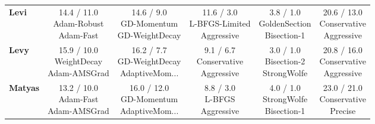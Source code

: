 \documentclass[10pt]{article}
\begin{document}
\begin{longtable}{lccccc}
\textbf{Levi} &  \makecell{14.4 / 11.0 \\ \scriptsize{Adam-Robust} \\ \scriptsize{Adam-Fast}}&  \makecell{14.6 / 9.0 \\ \scriptsize{GD-Momentum} \\ \scriptsize{GD-WeightDecay}}&  \makecell{11.6 / 3.0 \\ \scriptsize{L-BFGS-Limited} \\ \scriptsize{Aggressive}}& \cellcolor{green!20} \makecell{3.8 / 1.0 \\ \scriptsize{GoldenSection} \\ \scriptsize{Bisection-1}}& \cellcolor{red!15} \makecell{20.6 / 13.0 \\ \scriptsize{Conservative} \\ \scriptsize{Aggressive}} \\
\textbf{Levy} &  \makecell{15.9 / 10.0 \\ \scriptsize{WeightDecay} \\ \scriptsize{Adam-AMSGrad}}&  \makecell{16.2 / 7.7 \\ \scriptsize{GD-WeightDecay} \\ \scriptsize{AdaptiveMom...}}&  \makecell{9.1 / 6.7 \\ \scriptsize{Conservative} \\ \scriptsize{Aggressive}}& \cellcolor{green!20} \makecell{3.0 / 1.0 \\ \scriptsize{Bisection-2} \\ \scriptsize{StrongWolfe}}& \cellcolor{red!15} \makecell{20.8 / 16.0 \\ \scriptsize{Conservative} \\ \scriptsize{Aggressive}} \\
\textbf{Matyas} &  \makecell{13.2 / 10.0 \\ \scriptsize{Adam-Fast} \\ \scriptsize{Adam-AMSGrad}}&  \makecell{16.0 / 12.0 \\ \scriptsize{GD-Momentum} \\ \scriptsize{AdaptiveMom...}}&  \makecell{8.8 / 3.0 \\ \scriptsize{L-BFGS} \\ \scriptsize{Aggressive}}& \cellcolor{green!20} \makecell{4.0 / 1.0 \\ \scriptsize{StrongWolfe} \\ \scriptsize{Bisection-1}}& \cellcolor{red!15} \makecell{23.0 / 21.0 \\ \scriptsize{Conservative} \\ \scriptsize{Precise}} \\

\end{longtable}
\end{document}
